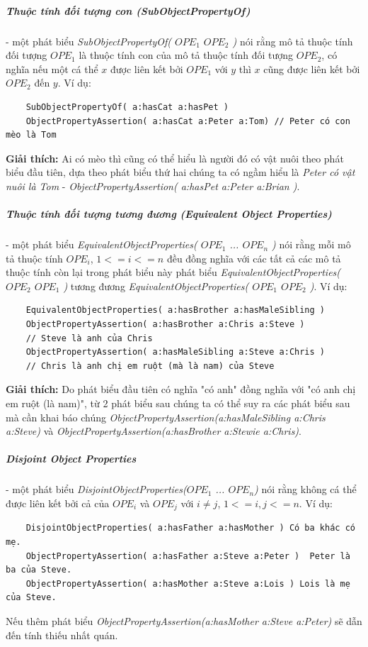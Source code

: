 	\subparagraph{Thuộc tính đối tượng con (SubObjectPropertyOf)} - một phát biểu \textit{SubObjectPropertyOf( $OPE_{1}$ $OPE_{2}$ )} nói rằng mô tả thuộc tính đối tượng $OPE_{1}$ là thuộc tính con của mô tả thuộc tính đối tượng $OPE_{2}$, có nghĩa nếu một cá thể $x$ được liên kết bởi $OPE_{1}$ với $y$ thì $x$ cũng được liên kết bởi $OPE_{2}$ đến $y$. Ví dụ:
	\begin{verbatim}
	SubObjectPropertyOf( a:hasCat a:hasPet )     
	ObjectPropertyAssertion( a:hasCat a:Peter a:Tom) // Peter có con mèo là Tom
	\end{verbatim}
	\textbf{Giải thích:} Ai có mèo thì cũng có thể hiểu là người đó có vật nuôi theo phát biểu đầu tiên, dựa theo phát biểu thứ hai chúng ta có ngầm hiểu là \textit{Peter có vật nuôi là Tom} - \textit{ObjectPropertyAssertion( a:hasPet a:Peter a:Brian )}.
	
	\subparagraph{Thuộc tính đối tượng tương đương (Equivalent Object Properties)} - một phát biểu \textit{EquivalentObjectProperties( $OPE_{1}$ ... $OPE_{n}$ )} nói rằng mỗi mô tả thuộc tính $OPE_{i}$, $1<=i<=n$ đều đồng nghĩa với các tất cả các mô tả thuộc tính còn lại trong phát biểu này phát biểu \textit{EquivalentObjectProperties( $OPE_{2}$ $OPE_{1}$ )} tương đương \textit{EquivalentObjectProperties( $OPE_{1}$ $OPE_{2}$ )}. Ví dụ:
	\begin{verbatim}
	EquivalentObjectProperties( a:hasBrother a:hasMaleSibling ) 
	ObjectPropertyAssertion( a:hasBrother a:Chris a:Steve )     
	// Steve là anh của Chris
	ObjectPropertyAssertion( a:hasMaleSibling a:Steve a:Chris ) 
	// Chris là anh chị em ruột (mà là nam) của Steve
	\end{verbatim}
	\textbf{Giải thích:} Do phát biểu đầu tiên có nghĩa "có anh" đồng nghĩa với "có anh chị em ruột (là nam)", từ 2 phát biểu sau chúng ta có thể suy ra các phát biểu sau mà cần khai báo chúng \textit{ObjectPropertyAssertion(a:hasMaleSibling a:Chris a:Steve)} và \textit{ObjectPropertyAssertion(a:hasBrother a:Stewie a:Chris)}.
	
	\subparagraph{Disjoint Object Properties} - một phát biểu \textit{DisjointObjectProperties($OPE_{1}$ ... $OPE_{n}$)} nói rằng không cá thể được liên kết bởi cả của $OPE_{i}$ và $OPE_{j}$ với $i \neq j$, $1<=i,j<=n$. Ví dụ:
	\begin{verbatim}
	DisjointObjectProperties( a:hasFather a:hasMother ) Có ba khác có mẹ.
	ObjectPropertyAssertion( a:hasFather a:Steve a:Peter )	Peter là ba của Steve.
	ObjectPropertyAssertion( a:hasMother a:Steve a:Lois ) Lois là mẹ của Steve.
	\end{verbatim}
	Nếu thêm phát biểu \textit{ObjectPropertyAssertion(a:hasMother a:Steve a:Peter)} sẽ dẫn đến tính thiếu nhất quán.
	
